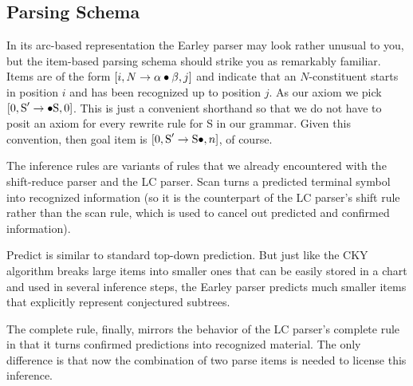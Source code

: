 \subsection{Parsing Schema}

In its arc-based representation the Earley parser may look rather unusual to you, but the item-based parsing schema should strike you as remarkably familiar.
Items are of the form $[i, N \rewrite \alpha \psep \beta, j]$ and indicate that an $N$-constituent starts in position $i$ and has been recognized up to position $j$.
As our axiom we pick $[0, \text{S}' \rewrite \psep \text{S},0]$.
This is just a convenient shorthand so that we do not have to posit an axiom for every rewrite rule for S in our grammar.
Given this convention, then goal item is $[0, \text{S}' \rewrite \text{S} \psep,n]$, of course.

The inference rules are variants of rules that we already encountered with the shift-reduce parser and the LC parser.
Scan turns a predicted terminal symbol into recognized information (so it is the counterpart of the LC parser's shift rule rather than the scan rule, which is used to cancel out predicted and confirmed information).
%
\begin{prooftree}
\end{prooftree}
%
Predict is similar to standard top-down prediction.
But just like the CKY algorithm breaks large items into smaller ones that can be easily stored in a chart and used in several inference steps, the Earley parser predicts much smaller items that explicitly represent conjectured subtrees.
%
\begin{prooftree}
\end{prooftree}
%
The complete rule, finally, mirrors the behavior of the LC parser's complete rule in that it turns confirmed predictions into recognized material.
The only difference is that now the combination of two parse items is needed to license this inference.
%
\begin{prooftree}
\end{prooftree}

